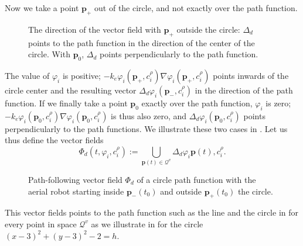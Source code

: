 Now we take a point $\mathbf{p}_{+}$ out of the circle, and not exactly over the path function. 
\begin{figure}[h!]
  \centering
  \selectfont
  
  \caption[The direction of the vector field outside and on the path function]{The direction of the vector field with $\mathbf{p}_{+}$ outside the circle: $\Delta_d$ points to the path function in the direction of the center of the circle. With $\mathbf{p}_{0}$, $\Delta_d$ points perpendicularly to the path function.}
  \label{fig:grad_gvf2}
\end{figure}
The value of $\varphi_i$ is positive; $-k_e\varphi_i(\mathbf{p}_{+},c_i^\rho)\nabla\varphi_i(\mathbf{p}_{+},c_i^\rho)$ points inwards of the circle center and the resulting vector $\Delta_d\varphi_i(\mathbf{p}_{-},c_i^\rho)$ in the direction of the path function. If we finally take a point $\mathbf{p}_{0}$ exactly over the path function, $\varphi_i$ is zero; $-k_e\varphi_i(\mathbf{p}_{0},c_i^\rho)\nabla\varphi_i(\mathbf{p}_{0},c_i^\rho)$ is thus also zero, and $\Delta_d\varphi_i(\mathbf{p}_{0},c_i^\rho)$ points perpendicularly to the path functions. We illustrate these two cases in . Let us thus define the vector fields
\begin{equation}
  \varPhi_d(t,\varphi_i,c_i^\rho):=\bigcup\limits_{\mathbf{p}(t)\in\mathcal{Q}^v}{\Delta_d\varphi_i{\mathbf{p}(t),c_i^\rho}}.
\end{equation}

\begin{figure}[h!]
  \centering
  \selectfont
  
  \caption[Path-following vector field of a circle path function.]{Path-following vector field $\varPhi_d$ of a circle path function with the aerial robot starting inside $\mathbf{p}_{-}(t_0)$ and outside $\mathbf{p}_{+}(t_0)$ the circle.}
  \label{fig:vecfs}
\end{figure}
This vector fields points to the path function such as the line and the circle in  for every point in space $\mathcal{Q}^v$ as we illustrate in  for the circle $(x-3)^2+(y-3)^2-2=h$.

